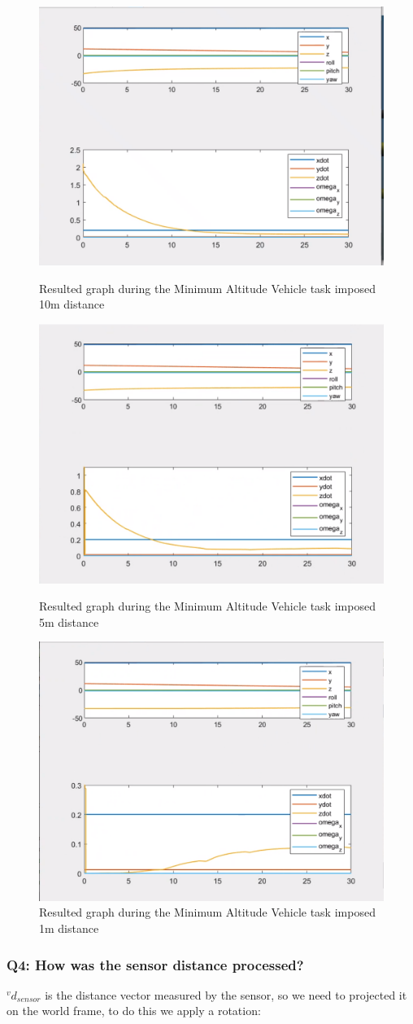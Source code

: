 \documentclass{article}
\begin{document}
\begin{figure}[htp]
\centering
\includegraphics[width=.5\textwidth]{123_MAV10m_ppdot.png}\caption{Resulted graph during the Minimum Altitude Vehicle task imposed 10m distance}
\label{sidebyside_10}
\centering
\includegraphics[width=.5\textwidth]{123_MAV5m_ppdot.png}\caption{Resulted graph during the Minimum Altitude Vehicle task imposed 5m distance}
\label{sidebyside_5}
\centering
\includegraphics[width=.5\textwidth]{123_MAV1m_ppdot.png}\caption{Resulted graph during the Minimum Altitude Vehicle task imposed 1m distance}
\label{sidebyside_1}
\end{figure}

\subsubsection{Q4: How was the sensor distance processed?}
 
 ${^{v}d_{sensor}}$ is the distance vector measured by the sensor, so we need to projected it on the world frame, to do this we apply a rotation:
 
\end{document}

